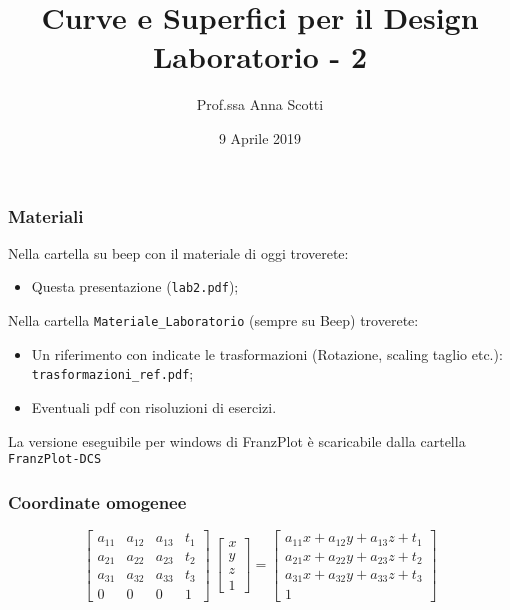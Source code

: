 \documentclass{beamer}
\title[Curve e Sup. - Lab 2]{Curve e Superfici per il Design \\ Laboratorio - 2}
\author[Prof.ssa Scotti]{Prof.ssa Anna Scotti}
\date{9 Aprile 2019}
\newcommand{\frnzplt}{FranzPlot }
\begin{document}
\begin{frame}
\maketitle
\end{frame}
\begin{frame}
\frametitle{Materiali}
Nella cartella su beep con il materiale di oggi troverete:
\begin{itemize}
\item Questa presentazione (\texttt{lab2.pdf});
\end{itemize}
Nella cartella \texttt{Materiale\_Laboratorio} (sempre su Beep) troverete:
\begin{itemize}
\item Un riferimento con indicate le trasformazioni (Rotazione, scaling taglio etc.): \texttt{trasformazioni\_ref.pdf};
\item Eventuali pdf con risoluzioni di esercizi.
\end{itemize}
La versione eseguibile per windows di \frnzplt \`e scaricabile dalla cartella \texttt{FranzPlot-DCS}
\end{frame}
\begin{frame}
\frametitle{Coordinate omogenee}
\begin{displaymath}
\begin{bmatrix}
a_{11} & a_{12} & a_{13} & t_1 \\
a_{21} & a_{22} & a_{23} & t_2 \\
a_{31} & a_{32} & a_{33} & t_3 \\
0      &    0   &  0     & 1 
\end{bmatrix}
~\begin{bmatrix}
x \\ y\\ z\\ 1
\end{bmatrix}
=  
\begin{bmatrix}
a_{11}x + a_{12}y + a_{13}z + t_1 \\
a_{21}x + a_{22}y + a_{23}z + t_2 \\
a_{31}x + a_{32}y + a_{33}z + t_3 \\
 1
\end{bmatrix}
\end{displaymath}
\end{frame}
\end{document}
